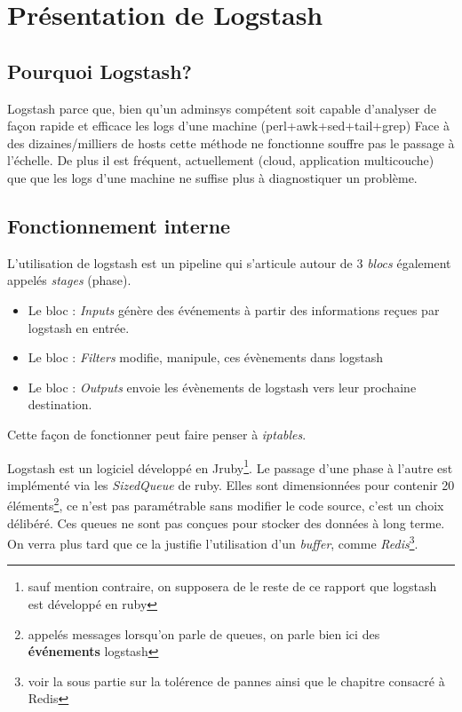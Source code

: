 \section{Présentation de Logstash}

\subsection{Pourquoi Logstash?}
Logstash parce que, bien qu'un adminsys compétent soit capable d'analyser
de façon rapide et efficace les logs d'une machine (perl+awk+sed+tail+grep)
Face à des dizaines/milliers de hosts cette méthode ne fonctionne souffre pas
le passage à l'échelle.
De plus il est fréquent, actuellement (cloud, application multicouche) que
que les logs d'une machine ne suffise plus à diagnostiquer un problème.

\subsection{Fonctionnement interne}
L'utilisation de logstash est un pipeline qui s'articule autour de 3 \emph{blocs} 
également appelés \emph{stages} (phase).
\begin{itemize}
    \item   Le bloc : \emph{Inputs} génère des événements à partir des informations reçues
    par logstash en entrée.
    \item   Le bloc : \emph{Filters} modifie, manipule, ces évènements dans logstash
    \item   Le bloc : \emph{Outputs} envoie les évènements de logstash vers leur 
    prochaine destination.
\end{itemize}

Cette façon de fonctionner peut faire penser à \emph{iptables}.

Logstash est un logiciel développé en Jruby\footnote{sauf mention contraire, on supposera
de le reste de ce rapport que logstash est développé en ruby}. Le passage d'une phase 
à l'autre est implémenté via les \emph{SizedQueue} de ruby. Elles sont dimensionnées 
pour contenir 20 éléments\footnote{appelés messages lorsqu'on parle de queues, 
on parle bien ici des \textbf{événements} logstash}, ce n'est pas paramétrable sans 
modifier le code source, c'est un choix délibéré. Ces queues ne sont pas conçues 
pour stocker des données à long terme. On verra plus tard que ce la justifie l'utilisation
d'un \textit{buffer}, comme \emph{Redis}\footnote{voir la sous partie sur la tolérence
de pannes ainsi que le chapitre consacré à Redis}.


